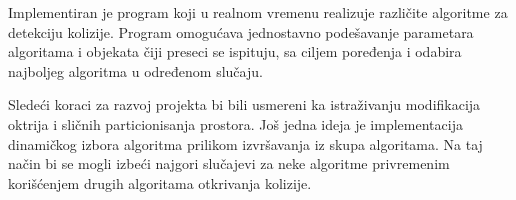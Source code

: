 \documentclass[12pt,oneside]{memoir}
\begin{document}
Implementiran je program koji u realnom vremenu realizuje različite algoritme
za detekciju kolizije.
Program omogućava jednostavno podešavanje parametara algoritama i objekata čiji preseci se ispituju,
sa ciljem poređenja i odabira najboljeg algoritma u određenom slučaju.

Sledeći koraci za razvoj projekta bi bili usmereni ka istraživanju modifikacija oktrija 
i sličnih particionisanja prostora.
Još jedna ideja je implementacija dinamičkog izbora algoritma prilikom izvršavanja iz skupa algoritama.
Na taj način bi se mogli izbeći najgori slučajevi za neke algoritme privremenim korišćenjem drugih  
algoritama otkrivanja kolizije.



\literatura

\backmatter


\end{document}

